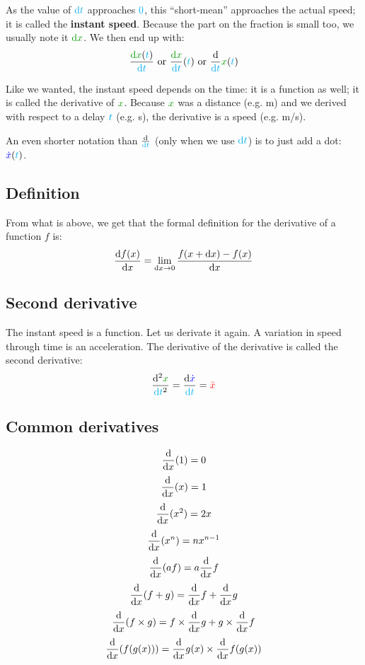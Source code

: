 As the value of $\textcolor{cyan}{\mathrm{d} t}$ approaches $\textcolor{cyan}{0}$, this
“short-mean” approaches the actual speed; it is called the
\textbf{instant speed}. Because the part on the fraction is small too,
we usually note it $\dist{\d x}$. We then end up with:
\[
\frac {\dist{\d x}(\delay{t})} {\delay{\dt}}
\text{ or }
\frac {\dist{\d x}} {\delay{\dt}}(\delay{t})
\text{ or }
\frac {\d} {\delay{\dt}} \dist{x}(\delay{t})
\]

Like we wanted, the instant speed depends on the time: it is a function
as well; it is called the derivative of $\dist{x}$. Because $\dist{x}$
was a distance (e.g. m) and we derived with respect to a delay $\textcolor{cyan}{t}$
(e.g. s), the derivative is a speed (e.g. m/s).

\begin{remark}
An even shorter notation than $\frac {\mathrm{d}} {\textcolor{cyan}{\mathrm{d} t}}$ (only when we
use $\textcolor{cyan}{\mathrm{d} t}$) is to just add a dot: $\textcolor{blue}{\dot x}(\textcolor{cyan}{t})$.
\end{remark}


\subsection{Definition}

From what is above, we get that the formal definition for the derivative
of a function $f$ is:
\[
\frac {\mathrm{d} f(x)} {\mathrm{d} x}
= \lim_{\mathrm{d} x \rightarrow 0} \frac {f(x+\mathrm{d} x) - f(x)} {\mathrm{d} x}
\]


\subsection{Second derivative}

The instant speed is a function. Let us derivate it again. A variation in
speed through time is an acceleration.  The derivative of the derivative
is called the second derivative: \[
\frac {\d^2 \dist{x}} {\delay{\dt}^2}
= \frac {\d \speed{\dot x}} {\delay{\dt}}
= \accel{\ddot x}
\]


\subsection{Common derivatives}

\[
\frac {\mathrm{d}} {\mathrm{d} x} (1)   = 0
\]
\[
\frac {\mathrm{d}} {\mathrm{d} x} (x)   = 1
\]
\[
\frac {\mathrm{d}} {\mathrm{d} x} (x^2) = 2x
\]
\[
\frac {\mathrm{d}} {\mathrm{d} x} (x^n) = n x^{n-1}
\]
\[
\frac {\mathrm{d}} {\mathrm{d} x} (a f)
= a \frac {\mathrm{d}} {\mathrm{d} x} f
\]
\[
\frac {\mathrm{d}} {\mathrm{d} x} (f + g)
= \frac {\mathrm{d}} {\mathrm{d} x} f
+ \frac {\mathrm{d}} {\mathrm{d} x} g
\]
\[
\frac {\mathrm{d}} {\mathrm{d} x} (f \times g)
= f \times \frac {\mathrm{d}} {\mathrm{d} x} g
+ g \times \frac {\mathrm{d}} {\mathrm{d} x} f
\]
\[
\frac {\mathrm{d}} {\mathrm{d} x} (f(g(x)))
= \frac {\mathrm{d}} {\mathrm{d} x} g(x)
\times \frac {\mathrm{d}} {\mathrm{d} x} f(g(x))
\]



